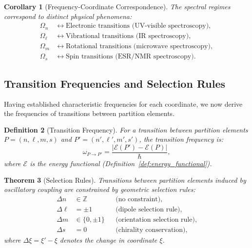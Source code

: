 \documentclass[twocolumn,10pt,a4paper]{article}
\newtheorem{theorem}{Theorem}[section]
\newtheorem{corollary}[theorem]{Corollary}
\newtheorem{definition}[theorem]{Definition}
\theoremstyle{remark}
\newcommand{\Integers}{\mathbb{Z}}
\begin{document}
\begin{corollary}[Frequency-Coordinate Correspondence]
\label{cor:freq_coord_correspondence}
The spectral regimes correspond to distinct physical phenomena:
\begin{align}
\Omega_n &\longleftrightarrow \text{Electronic transitions (UV-visible spectroscopy)}, \\
\Omega_\ell &\longleftrightarrow \text{Vibrational transitions (IR spectroscopy)}, \\
\Omega_m &\longleftrightarrow \text{Rotational transitions (microwave spectroscopy)}, \\
\Omega_s &\longleftrightarrow \text{Spin transitions (ESR/NMR spectroscopy)}.
\end{align}
\end{corollary}

\subsection{Transition Frequencies and Selection Rules}

Having established characteristic frequencies for each coordinate, we now derive the frequencies of transitions between partition elements.

\begin{definition}[Transition Frequency]
\label{def:transition_frequency}
For a transition between partition elements $P = (n, \ell, m, s)$ and $P' = (n', \ell', m', s')$, the \emph{transition frequency} is:
\begin{equation}
\omega_{P \to P'} = \frac{|\mathcal{E}(P') - \mathcal{E}(P)|}{\hbar},
\end{equation}
where $\mathcal{E}$ is the energy functional (Definition~\ref{def:energy_functional}).
\end{definition}

\begin{theorem}[Selection Rules]
\label{thm:selection_rules}
Transitions between partition elements induced by oscillatory coupling are constrained by geometric selection rules:
\begin{align}
\Delta n &\in \Integers && \text{(no constraint)}, \label{eq:sel_n} \\
\Delta \ell &= \pm 1 && \text{(dipole selection rule)}, \label{eq:sel_l} \\
\Delta m &\in \{0, \pm 1\} && \text{(orientation selection rule)}, \label{eq:sel_m} \\
\Delta s &= 0 && \text{(chirality conservation)}, \label{eq:sel_s}
\end{align}
where $\Delta \xi = \xi' - \xi$ denotes the change in coordinate $\xi$.
\end{theorem}
\end{document}
